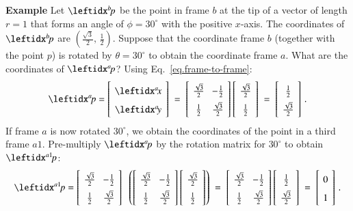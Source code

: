 \noindent\textbf{Example} Let $\bp$ be the point in frame $b$ at the tip of a vector of length $r=1$ that forms an angle of $\phi=30^{\circ}$ with the positive $x$-axis. The coordinates of $\bp$ are $\left(\frac{\sqrt{3}}{2},\,\frac{1}{2}\right)$. Suppose that the coordinate frame $b$ (together with the point $p$) is rotated by $\theta=30^{\circ}$ to obtain the coordinate frame $a$. What are the coordinates of $\ap$? Using Eq.~\ref{eq.frame-to-frame}:
\[
\spacearray
\ap=
\left[\begin{array}{c}\ax\\\ay\end{array}\right]\;=\;
\left[\begin{array}{cc}\frac{\sqrt{3}}{2}&-\frac{1}{2}\\\frac{1}{2}&\frac{\sqrt{3}}{2}\end{array}\right]
\left[\begin{array}{c}\frac{\sqrt{3}}{2}\\\frac{1}{2}\end{array}\right]\;=\;
\left[\begin{array}{c}\frac{1}{2}\\\frac{\sqrt{3}}{2}\end{array}\right]\,.
\]
If frame $a$ is now rotated $30^{\circ}$, we obtain the coordinates of the point in a third frame $a1$. Pre-multiply $\ap$ by the rotation matrix for $30^{\circ}$ to obtain $\aprimep$:
\[
\spacearray
\aprimep = \left[\begin{array}{cc}\frac{\sqrt{3}}{2}&-\frac{1}{2}\\\frac{1}{2}&\frac{\sqrt{3}}{2}\end{array}\right]\;\;
\left(\left[\begin{array}{cc}\frac{\sqrt{3}}{2}&-\frac{1}{2}\\\frac{1}{2}&\frac{\sqrt{3}}{2}\end{array}\right]
\left[\begin{array}{c}\frac{\sqrt{3}}{2}\\\frac{1}{2}\end{array}\right]\right)\;=\;
\left[\begin{array}{cc}\frac{\sqrt{3}}{2}&-\frac{1}{2}\\\frac{1}{2}&\frac{\sqrt{3}}{2}\end{array}\right]
\left[\begin{array}{c}\frac{1}{2}\\\frac{\sqrt{3}}{2}\end{array}\right]\;=\;
\left[\begin{array}{c}0\\1\end{array}\right]\,.
\]

